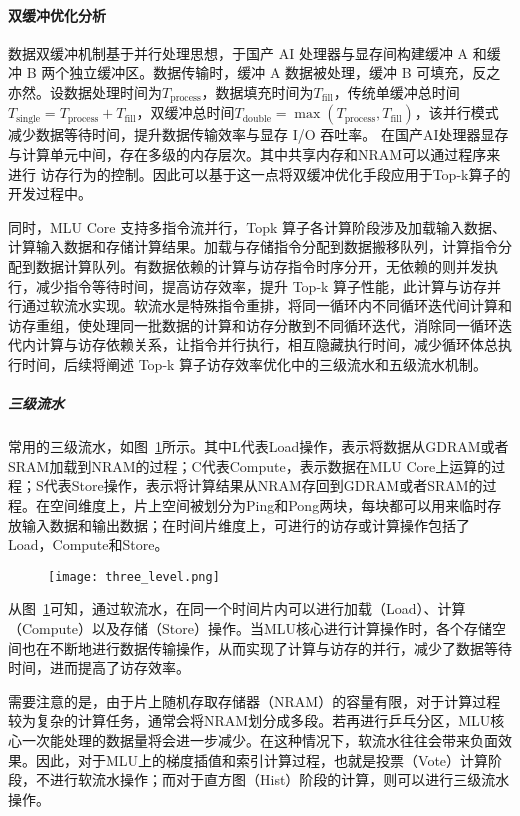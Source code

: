 \paragraph{双缓冲优化分析}

数据双缓冲机制基于并行处理思想，于国产 AI 处理器与显存间构建缓冲 A 和缓冲 B 两个独立缓冲区。数据传输时，缓冲 A 数据被处理，缓冲 B 可填充，反之亦然。设数据处理时间为\(T_{\text{process}}\)，数据填充时间为\(T_{\text{fill}}\)，传统单缓冲总时间\(T_{\text{single}} = T_{\text{process}} + T_{\text{fill}}\)，双缓冲总时间\(T_{\text{double}}=\max(T_{\text{process}}, T_{\text{fill}})\)，该并行模式减少数据等待时间，提升数据传输效率与显存 I/O 吞吐率。
在国产AI处理器显存与计算单元中间，存在多级的内存层次。其中共享内存和NRAM可以通过程序来进行
访存行为的控制。因此可以基于这一点将双缓冲优化手段应用于Top-k算子的开发过程中。

同时，MLU Core 支持多指令流并行，Topk 算子各计算阶段涉及加载输入数据、计算输入数据和存储计算结果。加载与存储指令分配到数据搬移队列，计算指令分配到数据计算队列。有数据依赖的计算与访存指令时序分开，无依赖的则并发执行，减少指令等待时间，提高访存效率，提升 Top-k 算子性能，此计算与访存并行通过软流水实现。软流水是特殊指令重排，将同一循环内不同循环迭代间计算和访存重组，使处理同一批数据的计算和访存分散到不同循环迭代，消除同一循环迭代内计算与访存依赖关系，让指令并行执行，相互隐藏执行时间，减少循环体总执行时间，后续将阐述 Top-k 算子访存效率优化中的三级流水和五级流水机制。


\subparagraph{三级流水}
常用的三级流水，如图~\ref{fig:three_level}所示。其中L代表Load操作，表示将数据从GDRAM或者SRAM加载到NRAM的过程；C代表Compute，表示数据在MLU Core上运算的过程；S代表Store操作，表示将计算结果从NRAM存回到GDRAM或者SRAM的过程。在空间维度上，片上空间被划分为Ping和Pong两块，每块都可以用来临时存放输入数据和输出数据；在时间片维度上，可进行的访存或计算操作包括了Load，Compute和Store。
\begin{figure}[ht]
    \centering
    \texttt{[image: three\_level.png]}
    \caption{}
    \label{fig:three_level}
\end{figure}
从图~\ref{fig:three_level}可知，通过软流水，在同一个时间片内可以进行加载（Load）、计算（Compute）以及存储（Store）操作。当MLU核心进行计算操作时，各个存储空间也在不断地进行数据传输操作，从而实现了计算与访存的并行，减少了数据等待时间，进而提高了访存效率。

需要注意的是，由于片上随机存取存储器（NRAM）的容量有限，对于计算过程较为复杂的计算任务，通常会将NRAM划分成多段。若再进行乒乓分区，MLU核心一次能处理的数据量将会进一步减少。在这种情况下，软流水往往会带来负面效果。因此，对于MLU上的梯度插值和索引计算过程，也就是投票（Vote）计算阶段，不进行软流水操作；而对于直方图（Hist）阶段的计算，则可以进行三级流水操作。



